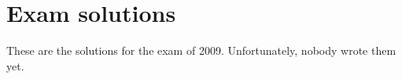 \documentclass[main]{subfiles}
\begin{document}

\section{Exam solutions}
These are the solutions for the exam of 2009. Unfortunately, nobody wrote them yet.
\end{document}
